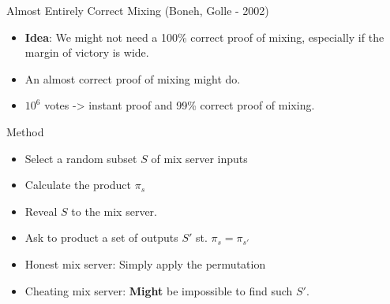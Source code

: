 \documentclass{beamer}
\begin{document}
\begin{frame}[allowframebreaks]{Almost Entirely Correct Mixing (Boneh, Golle - 2002)}

\begin{itemize}
\item \textbf{Idea}: We might not need a 100\% correct proof of mixing, especially if the margin of victory is wide.
\item An almost correct proof of mixing might do.
\item $10^6$ votes -> instant proof and 99\% correct proof of mixing.
\end{itemize}

\begin{block}{Method}
\begin{itemize}
\item Select a random subset $S$ of mix server inputs
\item Calculate the product $\pi_s$
\item Reveal $S$ to the mix server.
\item Ask to product a set of outputs $S'$ st. $\pi_s = \pi_{s'}$
\item Honest mix server:  Simply apply the permutation
\item Cheating mix server: \textbf{Might} be impossible to find such $S'$.
\end{itemize}
\end{block}


\end{frame}
\end{document}
